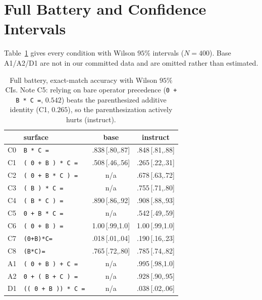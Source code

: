 \section{Full Battery and Confidence Intervals}
\label{app:battery}

Table~\ref{tab:fullbattery} gives every condition with Wilson $95\%$ intervals
($N = 400$). Base A1/A2/D1 are not in our committed data and are omitted rather than
estimated.

\begin{table}[h]
\centering
\footnotesize
\setlength{\tabcolsep}{3pt}
\begin{tabular}{@{}llcc@{}}
\toprule
 & surface & base & instruct \\
\midrule
C0 & \texttt{B * C =} & .838\,{\scriptsize[.80,.87]} & .848\,{\scriptsize[.81,.88]} \\
C1 & \texttt{( 0 + B ) * C =} & .508\,{\scriptsize[.46,.56]} & .265\,{\scriptsize[.22,.31]} \\
C2 & \texttt{( 0 + B * C ) =} & n/a & .678\,{\scriptsize[.63,.72]} \\
C3 & \texttt{( B ) * C =} & n/a & .755\,{\scriptsize[.71,.80]} \\
C4 & \texttt{( B * C ) =} & .890\,{\scriptsize[.86,.92]} & .908\,{\scriptsize[.88,.93]} \\
C5 & \texttt{0 + B * C =} & n/a & .542\,{\scriptsize[.49,.59]} \\
C6 & \texttt{( 0 + B ) =} & 1.00\,{\scriptsize[.99,1.0]} & 1.00\,{\scriptsize[.99,1.0]} \\
C7 & \texttt{(0+B)*C=} & .018\,{\scriptsize[.01,.04]} & .190\,{\scriptsize[.16,.23]} \\
C8 & \texttt{(B*C)=} & .765\,{\scriptsize[.72,.80]} & .785\,{\scriptsize[.74,.82]} \\
A1 & \texttt{( 0 + B ) + C =} & n/a & .995\,{\scriptsize[.98,1.0]} \\
A2 & \texttt{0 + ( B + C ) =} & n/a & .928\,{\scriptsize[.90,.95]} \\
D1 & \texttt{(( 0 + B )) * C =} & n/a & .038\,{\scriptsize[.02,.06]} \\
\bottomrule
\end{tabular}
\caption{Full battery, exact-match accuracy with Wilson $95\%$ CIs. Note C5: relying on bare
operator precedence (\texttt{0 + B * C =}, $0.542$) beats the parenthesized additive identity
(C1, $0.265$), so the parenthesization actively hurts (instruct).}
\label{tab:fullbattery}
\end{table}

